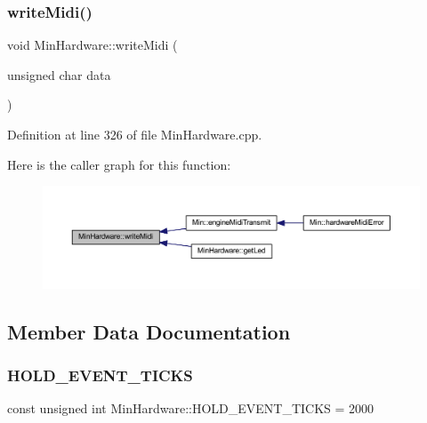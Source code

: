 \subsubsection{\texorpdfstring{write\+Midi()}{writeMidi()}}
{\footnotesize\ttfamily void Min\+Hardware\+::write\+Midi (\begin{DoxyParamCaption}\item[{unsigned char}]{data }\end{DoxyParamCaption})}



Definition at line 326 of file Min\+Hardware.\+cpp.

Here is the caller graph for this function\+:
\nopagebreak
\begin{figure}[H]
\begin{center}
\leavevmode
\includegraphics[width=350pt]{class_min_hardware_a9a29bee58534914c24171d362e78bd2a_icgraph}
\end{center}
\end{figure}


\subsection{Member Data Documentation}
\mbox{\label{class_min_hardware_ae90fda3fb4bdf7ffb4268ae487cd8334}} 
\subsubsection{\texorpdfstring{H\+O\+L\+D\+\_\+\+E\+V\+E\+N\+T\+\_\+\+T\+I\+C\+KS}{HOLD\_EVENT\_TICKS}}
{\footnotesize\ttfamily const unsigned int Min\+Hardware\+::\+H\+O\+L\+D\+\_\+\+E\+V\+E\+N\+T\+\_\+\+T\+I\+C\+KS = 2000\hspace{0.3cm}{\ttfamily [static]}}



